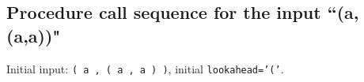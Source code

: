
\subsection{Procedure call sequence for the input ``(a,(a,a))"}
Initial input: \texttt{( a , ( a , a ) )}, initial \texttt{lookahead='('}.

